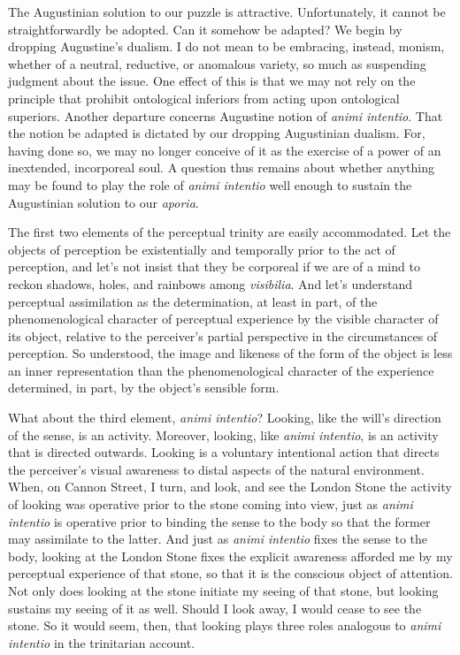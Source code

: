 \documentclass[12pt]{article}
\begin{document}
The Augustinian solution to our puzzle is attractive. Unfortunately, it cannot be straightforwardly be adopted. Can it somehow be adapted? We begin by dropping Augustine’s dualism. I do not mean to be embracing, instead, monism, whether of a neutral, reductive, or anomalous variety, so much as suspending judgment about the issue. One effect of this is that we may not rely on the principle that prohibit ontological inferiors from acting upon ontological superiors. 
Another departure concerns Augustine notion of \emph{animi intentio}. That the notion be adapted is dictated by our dropping Augustinian dualism. For, having done so, we may no longer conceive of it as the exercise of a power of an inextended, incorporeal soul. A question thus remains about whether anything may be found to play the role of \emph{animi intentio} well enough to sustain the Augustinian solution to our \emph{aporia}.

The first two elements of the perceptual trinity are easily accommodated. Let the objects of perception be existentially and temporally prior to the act of perception, and let's not insist that they be corporeal if we are of a mind to reckon shadows, holes, and rainbows among \emph{visibilia}. And let's understand perceptual assimilation as the determination, at least in part, of the phenomenological character of perceptual experience by the visible character of its object, relative to the perceiver’s partial perspective in the circumstances of perception. So understood, the image and likeness of the form of the object is less an inner representation than the phenomenological character of the experience determined, in part, by the object’s sensible form.

What about the third element, \emph{animi intentio}? Looking, like the will’s direction of the sense, is an activity. Moreover, looking, like \emph{animi intentio}, is an activity that is directed outwards. Looking is a voluntary intentional action that directs the perceiver’s visual awareness to distal aspects of the natural environment. When, on Cannon Street, I turn, and look, and see the London Stone the activity of looking was operative prior to the stone coming into view, just as \emph{animi intentio} is operative prior to binding the sense to the body so that the former may assimilate to the latter. And just as \emph{animi intentio} fixes the sense to the body, looking at the London Stone fixes the explicit awareness afforded me by my perceptual experience of that stone, so that it is the conscious object of attention. Not only does looking at the stone initiate my seeing of that stone, but looking sustains my seeing of it as well. Should I look away, I would cease to see the stone. So it would seem, then, that looking plays three roles analogous to \emph{animi intentio} in the trinitarian account. 
\end{document}
